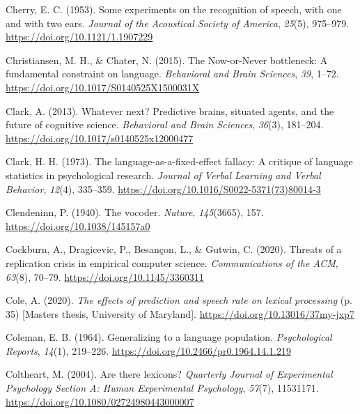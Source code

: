 \documentclass[a4paper, nobind]{templates/ociamthesis}
\newlength{\cslhangindent}
\newenvironment{CSLReferences}[2] %
 {%
  \setlength{\parindent}{0pt}
  \ifodd #1
  \let\oldpar\par
  \def\par{\hangindent=\cslhangindent\oldpar}
  \fi
  \setlength{\parskip}{1mm}
  \setlength{\baselineskip}{6mm}
 }%
 {}
\begin{document}
\begin{CSLReferences}{1}{0}
\leavevmode{}%
Cherry, E. C. (1953). {Some experiments on the recognition of speech, with one and with two ears}. \emph{Journal of the Acoustical Society of America}, \emph{25}(5), 975--979. \url{https://doi.org/10.1121/1.1907229}

\leavevmode{}%
Christiansen, M. H., \& Chater, N. (2015). {The Now-or-Never bottleneck: A fundamental constraint on language}. \emph{Behavioral and Brain Sciences}, \emph{39}, 1--72. \url{https://doi.org/10.1017/S0140525X1500031X}

\leavevmode{}%
Clark, A. (2013). Whatever next? Predictive brains, situated agents, and the future of cognitive science. \emph{Behavioral and Brain Sciences}, \emph{36}(3), 181--204. \url{https://doi.org/10.1017/s0140525x12000477}

\leavevmode{}%
Clark, H. H. (1973). {The language-as-a-fixed-effect fallacy: A critique of language statistics in psychological research}. \emph{Journal of Verbal Learning and Verbal Behavior}, \emph{12}(4), 335--359. \url{https://doi.org/10.1016/S0022-5371(73)80014-3}

\leavevmode{}%
Clendeninn, P. (1940). {The vocoder}. \emph{Nature}, \emph{145}(3665), 157. \url{https://doi.org/10.1038/145157a0}

\leavevmode{}%
Cockburn, A., Dragicevic, P., Besançon, L., \& Gutwin, C. (2020). {Threats of a replication crisis in empirical computer science}. \emph{Communications of the ACM}, \emph{63}(8), 70--79. \url{https://doi.org/10.1145/3360311}

\leavevmode{}%
Cole, A. (2020). \emph{{The effects of prediction and speech rate on lexical processing}} (p. 35) {[}Masters thesis, University of Maryland{]}. \url{https://doi.org/10.13016/37my-jxp7}

\leavevmode{}%
Coleman, E. B. (1964). {Generalizing to a language population}. \emph{Psychological Reports}, \emph{14}(1), 219--226. \url{https://doi.org/10.2466/pr0.1964.14.1.219}

\leavevmode{}%
Coltheart, M. (2004). Are there lexicons? \emph{Quarterly Journal of Experimental Psychology Section A: Human Experimental Psychology}, \emph{57}(7), 11531171. \url{https://doi.org/10.1080/02724980443000007}


\end{CSLReferences}
\end{document}

